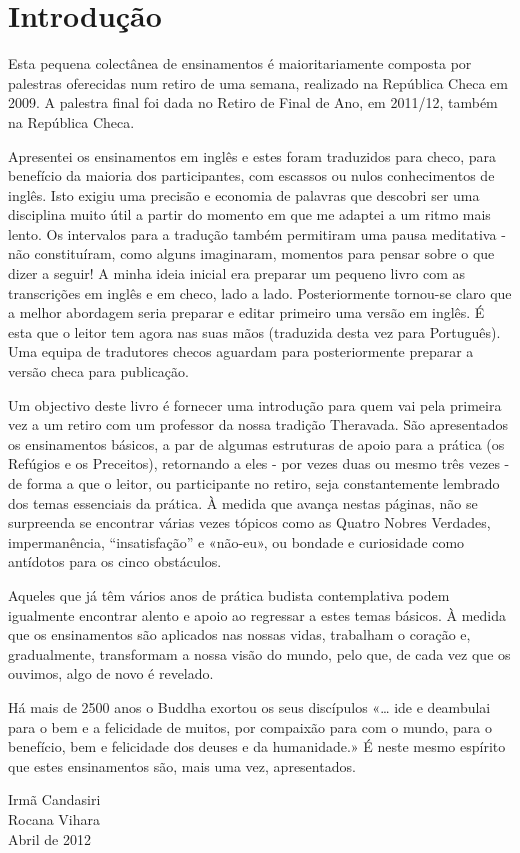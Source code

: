 \chapter{Introdução}

Esta pequena colectânea de ensinamentos é maioritariamente composta por
palestras oferecidas num retiro de uma semana, realizado na República
Checa em 2009. A palestra final foi dada no Retiro de Final de Ano, em
2011/12, também na República Checa.

Apresentei os ensinamentos em inglês e estes foram traduzidos para
checo, para benefício da maioria dos participantes, com escassos ou
nulos conhecimentos de inglês. Isto exigiu uma precisão e economia de
palavras que descobri ser uma disciplina muito útil a partir do momento
em que me adaptei a um ritmo mais lento. Os intervalos para a tradução
também permitiram uma pausa meditativa - não constituíram, como alguns
imaginaram, momentos para pensar sobre o que dizer a seguir! A minha
ideia inicial era preparar um pequeno livro com as transcrições em
inglês e em checo, lado a lado. Posteriormente tornou-se claro que a
melhor abordagem seria preparar e editar primeiro uma versão em inglês.
É esta que o leitor tem agora nas suas mãos (traduzida desta vez para
Português). Uma equipa de tradutores checos aguardam para posteriormente
preparar a versão checa para publicação.

Um objectivo deste livro é fornecer uma introdução para quem vai pela
primeira vez a um retiro com um professor da nossa tradição Theravada.
São apresentados os ensinamentos básicos, a par de algumas estruturas de
apoio para a prática (os Refúgios e os Preceitos), retornando a eles -
por vezes duas ou mesmo três vezes - de forma a que o leitor, ou
participante no retiro, seja constantemente lembrado dos temas
essenciais da prática. À medida que avança nestas páginas, não se
surpreenda se encontrar várias vezes tópicos como as Quatro Nobres
Verdades, impermanência, ``insatisfação'' e «não-eu», ou bondade e
curiosidade como antídotos para os cinco obstáculos.

Aqueles que já têm vários anos de prática budista contemplativa podem
igualmente encontrar alento e apoio ao regressar a estes temas básicos.
À medida que os ensinamentos são aplicados nas nossas vidas, trabalham o
coração e, gradualmente, transformam a nossa visão do mundo, pelo que,
de cada vez que os ouvimos, algo de novo é revelado.

Há mais de 2500 anos o Buddha exortou os seus discípulos «\ldots{} ide e
deambulai para o bem e a felicidade de muitos, por compaixão para com o
mundo, para o benefício, bem e felicidade dos deuses e da humanidade.» É
neste mesmo espírito que estes ensinamentos são, mais uma vez,
apresentados.

\bigskip

{\raggedleft
Irmã Candasiri\\
Rocana Vihara\\
Abril de 2012
\par}


